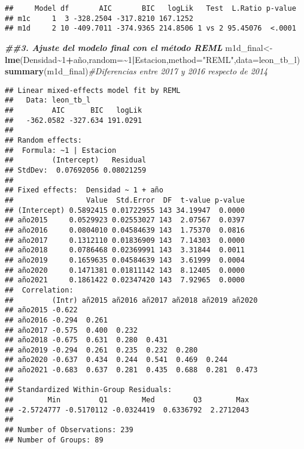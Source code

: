 \documentclass[
]{article}
\newenvironment{Shaded}{\begin{snugshade}}{\end{snugshade}}
\newcommand{\AttributeTok}[1]{\textcolor[rgb]{0.13,0.29,0.53}{#1}}
\newcommand{\CommentTok}[1]{\textcolor[rgb]{0.56,0.35,0.01}{\textit{#1}}}
\newcommand{\DecValTok}[1]{\textcolor[rgb]{0.00,0.00,0.81}{#1}}
\newcommand{\DocumentationTok}[1]{\textcolor[rgb]{0.56,0.35,0.01}{\textbf{\textit{#1}}}}
\newcommand{\FunctionTok}[1]{\textcolor[rgb]{0.13,0.29,0.53}{\textbf{#1}}}
\newcommand{\NormalTok}[1]{#1}
\newcommand{\OtherTok}[1]{\textcolor[rgb]{0.56,0.35,0.01}{#1}}
\newcommand{\SpecialCharTok}[1]{\textcolor[rgb]{0.81,0.36,0.00}{\textbf{#1}}}
\newcommand{\StringTok}[1]{\textcolor[rgb]{0.31,0.60,0.02}{#1}}
\begin{document}
\begin{verbatim}
##     Model df       AIC       BIC   logLik   Test  L.Ratio p-value
## m1c     1  3 -328.2504 -317.8210 167.1252                        
## m1d     2 10 -409.7011 -374.9365 214.8506 1 vs 2 95.45076  <.0001
\end{verbatim}

\begin{Shaded}
\begin{Highlighting}[]
\DocumentationTok{\#\#3. Ajuste del modelo final con el método REML}
\NormalTok{m1d\_final}\OtherTok{\textless{}{-}}\FunctionTok{lme}\NormalTok{(Densidad}\SpecialCharTok{\textasciitilde{}}\DecValTok{1}\SpecialCharTok{+}\NormalTok{año,}\AttributeTok{random=}\SpecialCharTok{\textasciitilde{}}\DecValTok{1}\SpecialCharTok{|}\NormalTok{Estacion,}\AttributeTok{method=}\StringTok{"REML"}\NormalTok{,}\AttributeTok{data=}\NormalTok{leon\_tb\_l)}
\FunctionTok{summary}\NormalTok{(m1d\_final)}\CommentTok{\#Diferencias entre 2017 y 2016 respecto de 2014}
\end{Highlighting}
\end{Shaded}

\begin{verbatim}
## Linear mixed-effects model fit by REML
##   Data: leon_tb_l 
##         AIC      BIC   logLik
##   -362.0582 -327.634 191.0291
## 
## Random effects:
##  Formula: ~1 | Estacion
##         (Intercept)   Residual
## StdDev:  0.07692056 0.08021259
## 
## Fixed effects:  Densidad ~ 1 + año 
##                 Value  Std.Error  DF  t-value p-value
## (Intercept) 0.5892415 0.01722955 143 34.19947  0.0000
## año2015     0.0529923 0.02553027 143  2.07567  0.0397
## año2016     0.0804010 0.04584639 143  1.75370  0.0816
## año2017     0.1312110 0.01836909 143  7.14303  0.0000
## año2018     0.0786468 0.02369991 143  3.31844  0.0011
## año2019     0.1659635 0.04584639 143  3.61999  0.0004
## año2020     0.1471381 0.01811142 143  8.12405  0.0000
## año2021     0.1861422 0.02347420 143  7.92965  0.0000
##  Correlation: 
##         (Intr) añ2015 añ2016 añ2017 añ2018 añ2019 añ2020
## año2015 -0.622                                          
## año2016 -0.294  0.261                                   
## año2017 -0.575  0.400  0.232                            
## año2018 -0.675  0.631  0.280  0.431                     
## año2019 -0.294  0.261  0.235  0.232  0.280              
## año2020 -0.637  0.434  0.244  0.541  0.469  0.244       
## año2021 -0.683  0.637  0.281  0.435  0.688  0.281  0.473
## 
## Standardized Within-Group Residuals:
##        Min         Q1        Med         Q3        Max 
## -2.5724777 -0.5170112 -0.0324419  0.6336792  2.2712043 
## 
## Number of Observations: 239
## Number of Groups: 89
\end{verbatim}
\end{document}
